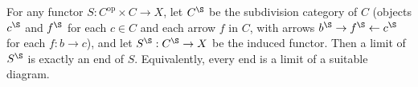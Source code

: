  For any functor $S : C^{\mathrm{op}} \times C \to X$, let $C^{\S}$ be the subdivision category of $C$ (objects $c^{\S}$ and $f^{\S}$ for each $c \in C$ and each arrow $f$ in $C$, with arrows $b^{\S} \to f^{\S} \leftarrow c^{\S}$ for each $f : b \to c$), and let $S^{\S} : C^{\S} \to X$ be the induced functor. Then a limit of $S^{\S}$ is exactly an end of $S$. Equivalently, every end is a limit of a suitable diagram.
